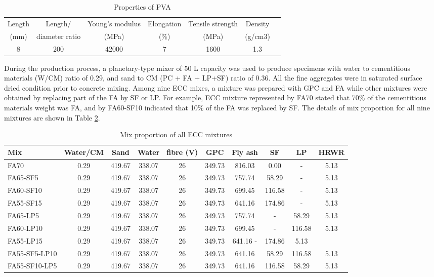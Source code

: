 \documentclass[11pt]{article}
\begin{document}
	\begin{table}[!h]
		\centering
		\caption{Properties of PVA}
		\begin{tabular}{ccccccc}
			\toprule
			Length &Length/&	Young’s modulus &	Elongation &Tensile strength &	Density \\
			(mm)	& diameter ratio & (MPa) & (\%)	 & (MPa) & (g/cm3) \\
			\midrule
			8&	200	&42000&	7&	1600&	1.3
			\\
			\bottomrule
		\end{tabular}
		\label{pva}
	\end{table}
	
	During the production process, a planetary-type mixer of 50 L capacity was used to produce specimens with water to cementitious materials (W/CM) ratio of 0.29, and sand to CM (PC + FA + LP+SF) ratio of 0.36. All the fine aggregates were in saturated surface dried condition prior to concrete mixing. Among nine ECC mixes, a mixture was prepared with GPC and FA while other mixtures were obtained by replacing part of the FA by SF or LP. For example, ECC mixture represented by FA70 stated that 70\% of the cementitious materials weight was FA, and by FA60-SF10 indicated that 10\% of the FA was replaced by SF. The details of mix proportion for all nine mixtures are shown in Table \ref{mx}. 
	
	
	\begin{table}[!tp]
		\centering
		\caption{Mix proportion of all ECC mixtures}
		\begin{tabular}{lccccccccc}
			\toprule
			Mix&	Water/CM	&Sand&	Water&	fibre (V)&	GPC	&Fly ash&	SF&	LP&	HRWR
			\\
			\midrule
			FA70&	0.29&	419.67&	338.07	&26	&349.73&	816.03	&0.00&	-	&5.13
			\\
			FA65-SF5&	0.29&	419.67&	338.07&	26	&349.73	&757.74&	58.29&	-&	5.13
			\\
			FA60-SF10	&0.29&	419.67&	338.07&26&	349.73&	699.45&	116.58	&-&	5.13
			\\
			FA55-SF15&	0.29&	419.67&	338.07&	26&	349.73&	641.16&	174.86	&-&	5.13
			\\
			FA65-LP5&	0.29&	419.67	&338.07&	26	&349.73	&757.74	&-	&58.29&	5.13
			\\
			FA60-LP10&	0.29&	419.67&	338.07&	26&	349.73	&699.45	&-	&116.58	&5.13
			\\
			FA55-LP15&	0.29&	419.67&	338.07&	26&	349.73	&641.16	-&	174.86	&5.13
			\\
			FA55-SF5-LP10&	0.29&	419.67&	338.07	&26&	349.73&	641.16	&58.29	&116.58	&5.13
			\\
			FA55-SF10-LP5	&0.29	&419.67	&338.07	&26	&349.73	&641.16	&116.58	&58.29	&5.13
			\\
			\bottomrule
		\end{tabular}
		\label{mx}
	\end{table}
	
\end{document}
